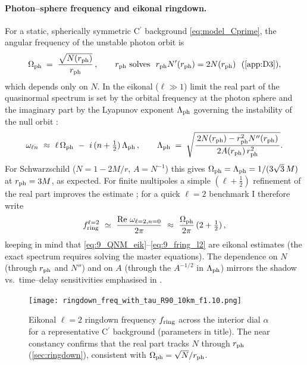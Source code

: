 \documentclass{iopjournal}
\begin{document}
\paragraph{Photon–sphere frequency and eikonal ringdown.}
For a static, spherically symmetric C$^\prime$ background \eqref{eq:model_Cprime}, the angular frequency of the unstable photon orbit is
\begin{equation}
\Omega_{\rm ph}\;=\;\frac{\sqrt{N(r_{\rm ph})}}{r_{\rm ph}}\,,\qquad
r_{\rm ph}\ \text{solves}\ \ r_{\rm ph}N'(r_{\rm ph})=2N(r_{\rm ph})\ \ \text{(\cref{app:D3})},
\label{eq:9_Omegaph}
\end{equation}
which depends only on $N$. In the eikonal ($\ell\gg1$) limit the real part of the quasinormal spectrum is set by the orbital frequency at the photon sphere and the imaginary part by the Lyapunov exponent $\Lambda_{\rm ph}$ governing the instability of the null orbit \cite{CardosoEtAl2009,DolanOttewill2009}:
\begin{equation}
\omega_{\ell n}\ \approx\ \ell\,\Omega_{\rm ph}\ -\ i\,(n+\tfrac12)\,\Lambda_{\rm ph}\,,
\qquad
\Lambda_{\rm ph}\;=\;\sqrt{\frac{\,2N(r_{\rm ph})-r_{\rm ph}^{2}N''(r_{\rm ph})\,}{\,2A(r_{\rm ph})\,r_{\rm ph}^{2}\,}}.
\label{eq:9_QNM_eik}
\end{equation}
For Schwarzschild ($N=1-2M/r$, $A=N^{-1}$) this gives $\Omega_{\rm ph}=\Lambda_{\rm ph}=1/(3\sqrt{3}\,M)$ at $r_{\rm ph}=3M$, as expected. For finite multipoles a simple $(\ell+\tfrac12)$ refinement of the real part improves the estimate \cite{DolanOttewill2009}; for a quick $\ell=2$ benchmark I therefore write
\begin{equation}
f_{\rm ring}^{\ell=2}\ \simeq\ \frac{\Re\,\omega_{\ell=2,n=0}}{2\pi}
\ \approx\ \frac{\Omega_{\rm ph}}{2\pi}\,(2+\tfrac12)\,,
\label{eq:9_fring_l2}
\end{equation}
keeping in mind that \eqref{eq:9_QNM_eik}–\eqref{eq:9_fring_l2} are eikonal estimates (the exact spectrum requires solving the master equations). The dependence on $N$ (through $r_{\rm ph}$ and $N''$) and on $A$ (through the $A^{-1/2}$ in $\Lambda_{\rm ph}$) mirrors the shadow vs.\ time–delay sensitivities emphasised in .

\begin{figure}[t]
\centering
\texttt{[image: ringdown\_freq\_with\_tau\_R90\_10km\_f1.10.png]}
\caption{Eikonal \(\ell=2\) ringdown frequency \(f_{\rm ring}\) across the interior dial \(\alpha\) for a representative C$^\prime$ background (parameters in title). The near constancy confirms that the real part tracks \(N\) through \(r_{\rm ph}\) (\cref{sec:ringdown}), consistent with \(\Omega_{\rm ph}=\sqrt{N}/r_{\rm ph}\).}
\label{fig:ringdown-frequency}
\end{figure}
\end{document}
